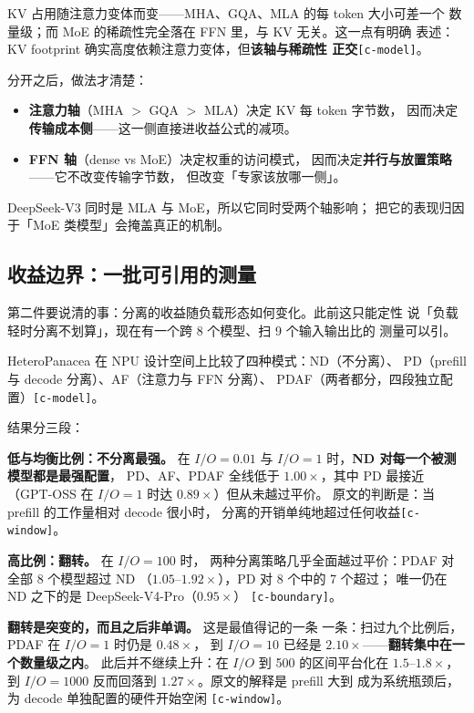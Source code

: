 KV 占用随注意力变体而变——MHA、GQA、MLA 的每 token 大小可差一个
数量级；而 MoE 的稀疏性完全落在 FFN 里，与 KV 无关。这一点有明确
表述：KV footprint 确实高度依赖注意力变体，但\textbf{该轴与稀疏性
正交}\texttt{[c-model]}。

分开之后，做法才清楚：

\begin{itemize}
\item \textbf{注意力轴}（MHA $>$ GQA $>$ MLA）决定 KV 每 token 字节数，
  因而决定\textbf{传输成本侧}——这一侧直接进收益公式的减项。
\item \textbf{FFN 轴}（dense vs MoE）决定权重的访问模式，
  因而决定\textbf{并行与放置策略}——它不改变传输字节数，
  但改变「专家该放哪一侧」。
\end{itemize}

DeepSeek-V3 同时是 MLA 与 MoE，所以它同时受两个轴影响；
把它的表现归因于「MoE 类模型」会掩盖真正的机制。

\subsection{收益边界：一批可引用的测量}

第二件要说清的事：分离的收益随负载形态如何变化。此前这只能定性
说「负载轻时分离不划算」，现在有一个跨 8 个模型、扫 9 个输入输出比的
测量可以引。

HeteroPanacea 在 NPU 设计空间上比较了四种模式：ND（不分离）、
PD（prefill 与 decode 分离）、AF（注意力与 FFN 分离）、
PDAF（两者都分，四段独立配置）\texttt{[c-model]}。

结果分三段：

\noindent\textbf{低与均衡比例：不分离最强。} 在 $I/O = 0.01$ 与
$I/O = 1$ 时，\textbf{ND 对每一个被测模型都是最强配置}，
PD、AF、PDAF 全线低于 $1.00\times$，其中 PD 最接近
（GPT-OSS 在 $I/O=1$ 时达 $0.89\times$）但从未越过平价。
原文的判断是：当 prefill 的工作量相对 decode 很小时，
分离的开销单纯地超过任何收益\texttt{[c-window]}。

\noindent\textbf{高比例：翻转。} 在 $I/O = 100$ 时，
两种分离策略几乎全面越过平价：PDAF 对全部 8 个模型超过 ND
（$1.05$--$1.92\times$），PD 对 8 个中的 7 个超过；
唯一仍在 ND 之下的是 DeepSeek-V4-Pro（$0.95\times$）
\texttt{[c-boundary]}。

\noindent\textbf{翻转是突变的，而且之后非单调。} 这是最值得记的一条
一条：扫过九个比例后，PDAF 在 $I/O=1$ 时仍是 $0.48\times$，
到 $I/O=10$ 已经是 $2.10\times$——\textbf{翻转集中在一个数量级之内}。
此后并不继续上升：在 $I/O$ 到 500 的区间平台化在 $1.5$--$1.8\times$，
到 $I/O=1000$ 反而回落到 $1.27\times$。原文的解释是 prefill 大到
成为系统瓶颈后，为 decode 单独配置的硬件开始空闲
\texttt{[c-window]}。

